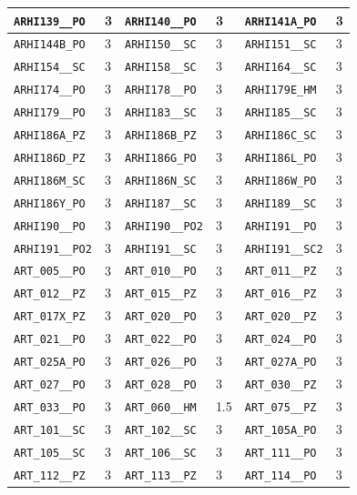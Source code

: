 \begin{longtable}{|l|l||l|l||l|l|}
    \verb|ARHI139__PO| & 3 & \verb|ARHI140__PO| & 3 & \verb|ARHI141A_PO| & 3\\\hline
    \verb|ARHI144B_PO| & 3 & \verb|ARHI150__SC| & 3 & \verb|ARHI151__SC| & 3\\\hline
    \verb|ARHI154__SC| & 3 & \verb|ARHI158__SC| & 3 & \verb|ARHI164__SC| & 3\\\hline
    \verb|ARHI174__PO| & 3 & \verb|ARHI178__PO| & 3 & \verb|ARHI179E_HM| & 3\\\hline
    \verb|ARHI179__PO| & 3 & \verb|ARHI183__SC| & 3 & \verb|ARHI185__SC| & 3\\\hline
    \verb|ARHI186A_PZ| & 3 & \verb|ARHI186B_PZ| & 3 & \verb|ARHI186C_SC| & 3\\\hline
    \verb|ARHI186D_PZ| & 3 & \verb|ARHI186G_PO| & 3 & \verb|ARHI186L_PO| & 3\\\hline
    \verb|ARHI186M_SC| & 3 & \verb|ARHI186N_SC| & 3 & \verb|ARHI186W_PO| & 3\\\hline
    \verb|ARHI186Y_PO| & 3 & \verb|ARHI187__SC| & 3 & \verb|ARHI189__SC| & 3\\\hline
    \verb|ARHI190__PO| & 3 & \verb|ARHI190__PO2| & 3 & \verb|ARHI191__PO| & 3\\\hline
    \verb|ARHI191__PO2| & 3 & \verb|ARHI191__SC| & 3 & \verb|ARHI191__SC2| & 3\\\hline
    \verb|ART_005__PO| & 3 & \verb|ART_010__PO| & 3 & \verb|ART_011__PZ| & 3\\\hline
    \verb|ART_012__PZ| & 3 & \verb|ART_015__PZ| & 3 & \verb|ART_016__PZ| & 3\\\hline
    \verb|ART_017X_PZ| & 3 & \verb|ART_020__PO| & 3 & \verb|ART_020__PZ| & 3\\\hline
    \verb|ART_021__PO| & 3 & \verb|ART_022__PO| & 3 & \verb|ART_024__PO| & 3\\\hline
    \verb|ART_025A_PO| & 3 & \verb|ART_026__PO| & 3 & \verb|ART_027A_PO| & 3\\\hline
    \verb|ART_027__PO| & 3 & \verb|ART_028__PO| & 3 & \verb|ART_030__PZ| & 3\\\hline
    \verb|ART_033__PO| & 3 & \verb|ART_060__HM| & 1.5 & \verb|ART_075__PZ| & 3\\\hline
    \verb|ART_101__SC| & 3 & \verb|ART_102__SC| & 3 & \verb|ART_105A_PO| & 3\\\hline
    \verb|ART_105__SC| & 3 & \verb|ART_106__SC| & 3 & \verb|ART_111__PO| & 3\\\hline
    \verb|ART_112__PZ| & 3 & \verb|ART_113__PZ| & 3 & \verb|ART_114__PO| & 3\\\hline

\end{longtable}
